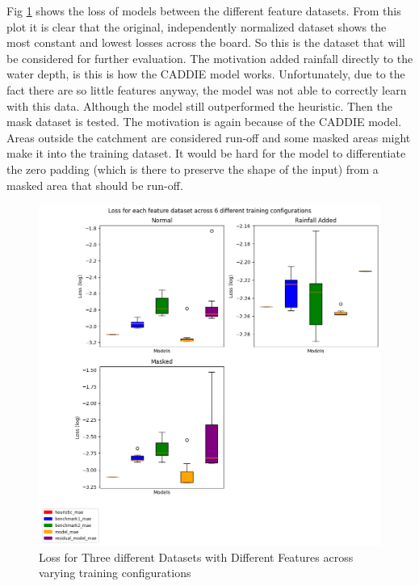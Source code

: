 Fig \ref{fig:norm-rain-mask-init} shows the loss of models between the different feature datasets. From this plot it is clear that the original, independently normalized dataset shows the most constant and lowest losses across the board. So this is the dataset that will be considered for further evaluation. The motivation added rainfall directly to the water depth, is this is how the CADDIE model works. Unfortunately, due to the fact there are so little features anyway, the  model was not able to correctly learn with this data. Although the model still outperformed the heuristic. Then the mask dataset is tested. The motivation is again because of the CADDIE model. Areas outside the catchment are considered run-off and some masked areas might make it into the training dataset. It would be hard for the model to differentiate the zero padding (which is there to preserve the shape of the input) from a masked area that should be run-off. 
\begin{figure}[tbph]
	\centering
	\includegraphics[width=0.7\linewidth, height=0.5\textheight]{Figures/Results/feature_manip/feature_manip_across_lr}
	\caption[Loss For Three different Datasets With Different Features]{Loss for Three different Datasets with Different Features across varying training configurations}
	\label{fig:norm-rain-mask-init}
\end{figure}

